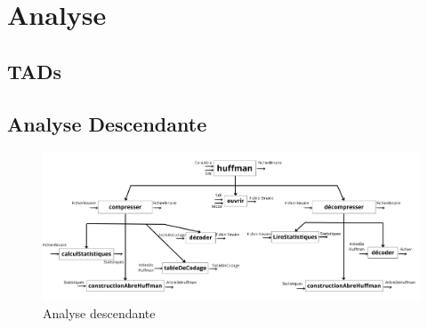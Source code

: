 \documentclass[12pt]{article}
\begin{document}


\newpage

\tableofcontents

\listoffigures


\newpage
\section{Analyse}

\subsection{TADs}







\subsection{Analyse Descendante}

\begin{figure}
    \centering
    \includegraphics[width=\textwidth]{parties/analyse/Analyse descendante/huffman.png}
    \caption{Analyse descendante}
\end{figure}
\end{document}
